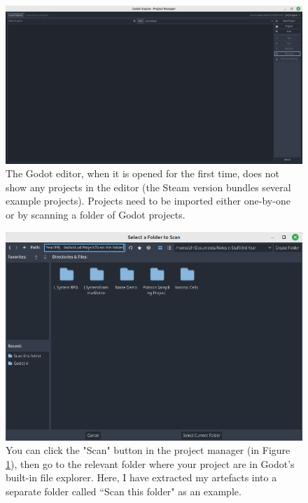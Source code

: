 \begin{figure}[H]
    \centering
    \includegraphics[width=\textwidth]{Images/open_godot.png}
    \caption{The Godot editor, when it is opened for the first time, does not show any projects in the editor (the Steam version bundles several example projects). Projects need to be imported either one-by-one or by scanning a folder of Godot projects.}
    \label{fig:godot1}
\end{figure}

\begin{figure}[H]
    \centering
    \includegraphics[width=\textwidth]{Images/scan-folder.png}
    \caption{You can click the "Scan" button in the project manager (in Figure \ref{fig:godot1}), then go to the relevant folder where your project are in Godot's built-in file explorer. Here, I have extracted my artefacts into a separate folder called ``Scan this folder" as an example.}
    \label{fig:godot2}
\end{figure}

